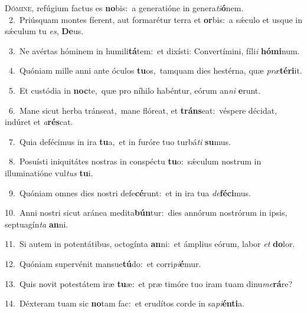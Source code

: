 \lettrine{\initial\textcolor{\initialcolor}{D}}{ómine,} refúgium factus es \textbf{no}\-bis:~\star a generatióne in genera\-\textit{ti}\-\textbf{ó}nem.\\
{\numbfont\textcolor{\numbcolor}{~2.}}~Priúsquam montes fíerent, aut formarétur terra et \textbf{or}\-bis:~\star a sǽculo et usque in sǽculum tu \textit{es}\-, \textbf{De}\-us.\par
{\numbfont\textcolor{\numbcolor}{~3.}}~Ne avértas hóminem in humili\-\textbf{tá}\-tem:~\star et dixísti: Convertímini, fíli\textit{i} \textbf{hó}\-\textbf{mi}num.\par
{\numbfont\textcolor{\numbcolor}{~4.}}~Quóniam mille anni ante óculos \textbf{tu}\-os,~\star tamquam dies hestérna, quæ \textit{præ}\-\textbf{tér}\textbf{i}it.\par
{\numbfont\textcolor{\numbcolor}{~5.}}~Et custódia in \textbf{noc}\-te,~\star quæ pro níhilo habéntur, eórum an\textit{ni} \textbf{e}\-runt.\par
{\numbfont\textcolor{\numbcolor}{~6.}}~Mane sicut herba tránseat,~\dagger mane flóreat, et \textbf{tráns}\-eat:~\star véspere décidat, indúret et \textit{a}\-\textbf{rés}cat.\par
{\numbfont\textcolor{\numbcolor}{~7.}}~Quia defécimus in ira \textbf{tu}\-a,~\star et in furóre tuo turbá\textit{ti} \textbf{su}\-mus.\par
{\numbfont\textcolor{\numbcolor}{~8.}}~Posuísti iniquitátes nostras in conspéctu \textbf{tu}\-o:~\star sǽculum nostrum in illuminatióne vul\textit{tus} \textbf{tu}\-i.\par
{\numbfont\textcolor{\numbcolor}{~9.}}~Quóniam omnes dies nostri defe\-\textbf{cé}\-runt:~\star et in ira tua \textit{de}\-\textbf{fé}\textbf{ci}mus.\par
{\numbfont\textcolor{\numbcolor}{10.}}~Anni nostri sicut aránea medita\-\textbf{bún}\-tur:~\star dies annórum nostrórum in ipsis, septuagín\textit{ta} \textbf{an}\-ni.\par
{\numbfont\textcolor{\numbcolor}{11.}}~Si autem in potentátibus, octogínta \textbf{an}\-ni:~\star et ámplius eórum, labor \textit{et} \textbf{do}\-lor.\par
{\numbfont\textcolor{\numbcolor}{12.}}~Quóniam supervénit mansue\-\textbf{tú}\-do:~\star et corri\-\textit{pi}\-\textbf{é}mur.\par
{\numbfont\textcolor{\numbcolor}{13.}}~Quis novit potestátem iræ \textbf{tu}\-æ:~\star et præ timóre tuo iram tuam dinu\-\textit{me}\-\textbf{rá}re?\par
{\numbfont\textcolor{\numbcolor}{14.}}~Déxteram tuam sic \textbf{no}\-tam fac:~\star et erudítos corde in sa\-\textit{pi}\-\textbf{én}\textbf{ti}a.\par
